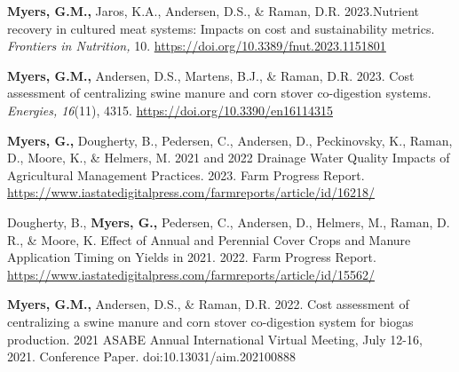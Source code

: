 




\begin{cvparagraph}

   
   \textbf{Myers, G.M., }Jaros, K.A., Andersen, D.S.,  \& Raman, D.R. 2023.Nutrient recovery in cultured meat systems: Impacts on cost and sustainability metrics. \textit{Frontiers in Nutrition,} 10. \url{https://doi.org/10.3389/fnut.2023.1151801}
   
   \textbf{Myers, G.M., }Andersen, D.S., Martens, B.J., \& Raman, D.R. 2023. Cost assessment of centralizing swine manure and corn stover co-digestion systems. \textit{Energies, 16}(11), 4315. \url{https://doi.org/10.3390/en16114315}


   \textbf{Myers, G., }Dougherty, B., Pedersen, C., Andersen, D., Peckinovsky, K., Raman, D., Moore, K., \& Helmers, M. 2021 and 2022 Drainage Water Quality Impacts of Agricultural Management Practices. 2023. Farm Progress Report. \url{https://www.iastatedigitalpress.com/farmreports/article/id/16218/}

   Dougherty, B., \textbf{Myers, G., }Pedersen, C., Andersen, D., Helmers, M., Raman, D. R., \&  Moore, K. Effect of Annual and Perennial Cover Crops and Manure Application Timing on Yields in 2021. 2022. Farm Progress Report. \url{https://www.iastatedigitalpress.com/farmreports/article/id/15562/}


   \textbf{Myers, G.M., }Andersen, D.S.,  \& Raman, D.R. 2022. Cost assessment of centralizing a swine manure and corn stover co-digestion system for biogas production. 2021 ASABE Annual International Virtual Meeting, July 12-16, 2021. Conference Paper. doi:10.13031/aim.202100888


\end{cvparagraph}
